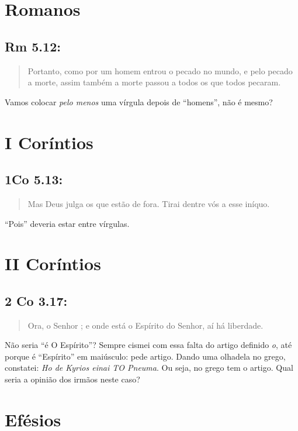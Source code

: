 \section{Romanos}
\subsection*{Rm 5.12:}
\begin{quote}
    \small
Portanto, como por um homem entrou o pecado no mundo, e  pelo pecado a morte, assim também a morte passou a todos os  que todos pecaram.
\end{quote}

Vamos colocar \emph{pelo menos} uma vírgula depois de ``homens'', não é mesmo?

\section{I Coríntios}
\subsection*{1Co 5.13:}
\begin{quote}
    \small
Mas Deus julga os que estão de fora. Tirai  dentre vós a esse iníquo.
\end{quote}

``Pois'' deveria estar entre vírgulas.

\section{II Coríntios}
\subsection*{2 Co 3.17:}
\begin{quote}
    \small
Ora, o Senhor ; e onde está o Espírito do
Senhor, aí há liberdade.
\end{quote}

Não seria ``é O Espírito''? Sempre cismei com essa falta do artigo definido \emph{o}, até porque é ``Espírito'' em maiúsculo: pede artigo. Dando uma olhadela no grego, constatei: \textit{Ho de Kyrios einai TO Pneuma}. Ou seja, no grego tem o artigo. Qual seria a opinião dos irmãos neste caso?

\section{Efésios}
